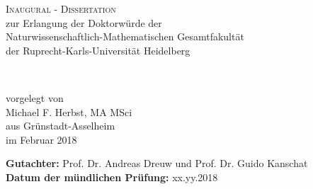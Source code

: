\begin{titlepage}
\begin{center}

	\Huge \textsc{Inaugural - Dissertation} \\[0.4cm]
	{\Large zur Erlangung der Doktorwürde der \\
	Naturwissenschaftlich-Mathematischen Gesamtfakultät \\
	der Ruprecht-Karls-Universität Heidelberg\\
	}

	\vfill

	{\Huge
	\textbf{\thesistitle}\\
	\vspace{0.5cm}
	\LARGE \thesissubtitle
	}

	\vfill

	\vfill

	{\large  vorgelegt von} \\
	\vspace{1.0cm}
	{\LARGE Michael F. Herbst, {\large \mbox{MA} \mbox{MSci}} }\\[-0.3em]
	{\large aus Grünstadt-Asselheim } \\
	\vspace{1.0cm}
	{\large im Februar 2018} \\

	\vspace{2cm}

	\begin{flushleft}
	\normalsize
		\textbf{Gutachter:} \qquad Prof. Dr. Andreas Dreuw \hfill und \hfill Prof. Dr. Guido Kanschat\\
		\textbf{Datum der mündlichen Prüfung:} \qquad xx.yy.2018
	\end{flushleft}
\end{center}
\end{titlepage}
